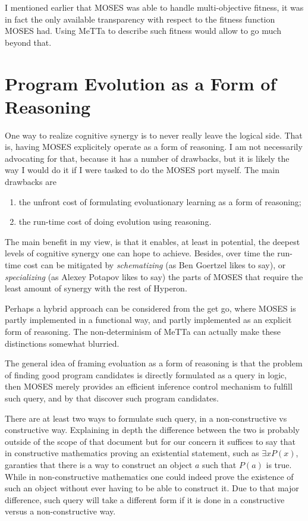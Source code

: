 \documentclass[]{report}
\begin{document}
I mentioned earlier that MOSES was able to handle multi-objective
fitness, it was in fact the only available transparency with respect
to the fitness function MOSES had.  Using MeTTa to describe such
fitness would allow to go much beyond that.

\section{Program Evolution as a Form of Reasoning}

One way to realize cognitive synergy is to never really leave the
logical side.  That is, having MOSES explicitely operate as a form of
reasoning.  I am not necessarily advocating for that, because it has a
number of drawbacks, but it is likely the way I would do it if I were
tasked to do the MOSES port myself.  The main drawbacks are
\begin{enumerate}
\item the unfront cost of formulating evoluationary learning as a form of
reasoning;
\item the run-time cost of doing evolution using reasoning.
\end{enumerate}
The main benefit in my view, is that it enables, at least in
potential, the deepest levels of cognitive synergy one can hope to
achieve.  Besides, over time the run-time cost can be mitigated by
\emph{schematizing} (as Ben Goertzel likes to say), or \emph{specializing} (as
Alexey Potapov likes to say) the parts of MOSES that require the least
amount of synergy with the rest of Hyperon.

Perhaps a hybrid approach can be considered from the get go, where
MOSES is partly implemented in a functional way, and partly
implemented as an explicit form of reasoning.  The non-determinism of
MeTTa can actually make these distinctions somewhat blurried.

The general idea of framing evoluation as a form of reasoning is that
the problem of finding good program candidates is directly formulated
as a query in logic, then MOSES merely provides an efficient inference
control mechanism to fulfill such query, and by that discover such
program candidates.

There are at least two ways to formulate such query, in a
non-constructive vs constructive way.  Explaining in depth the
difference between the two is probably outside of the scope of that
document but for our concern it suffices to say that in constructive
mathematics proving an existential statement, such as $\exists x
P(x)$, garanties that there is a way to construct an object $a$ such
that $P(a)$ is true.  While in non-constructive mathematics one could
indeed prove the existence of such an object without ever having to be
able to construct it.  Due to that major difference, such query will
take a different form if it is done in a constructive versus a
non-constructive way.
\end{document}
